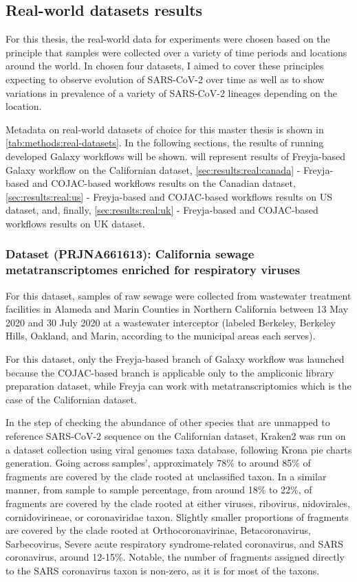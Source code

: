     
    \subsection{Real-world datasets results} \label{sec:results:real}
    For this thesis, the real-world data for experiments were chosen based on the principle that samples were collected over a variety of time periods and locations around the world. In chosen four datasets, I aimed to cover these principles expecting to observe evolution of SARS-CoV-2 over time as well as to show variations in prevalence of a variety of SARS-CoV-2 lineages depending on the location.

    Metadata on real-world datasets of choice for this master thesis is shown in \cref{tab:methods:real-datasets}. In the following sections, the results of running developed Galaxy workflows will be shown.  will represent results of Freyja-based Galaxy workflow on the Californian dataset, \cref{sec:results:real:canada} - Freyja-based and COJAC-based workflows results on the Canadian dataset, \cref{sec:results:real:us} - Freyja-based and COJAC-based workflows results on US dataset, and, finally, \cref{sec:results:real:uk} - Freyja-based and COJAC-based workflows results on UK dataset. 

    \subsubsection{Dataset (PRJNA661613): California sewage metatranscriptomes enriched for respiratory viruses} \label{sec:results:real:california}
    For this dataset, samples of raw sewage were collected from wastewater treatment facilities in Alameda and Marin Counties in Northern California between 13 May 2020 and 30 July 2020 at a wastewater interceptor (labeled Berkeley, Berkeley Hills, Oakland, and Marin, according to the municipal areas each serves).

    For this dataset, only the Freyja-based branch of Galaxy workflow was launched because the COJAC-based branch is applicable only to the ampliconic library preparation dataset, while Freyja can work with metatranscriptomics which is the case of the Californian dataset.
    
    In the step of checking the abundance of other species that are unmapped to reference SARS-CoV-2 sequence on the Californian dataset, Kraken2 was run on a dataset collection using viral genomes taxa database, following Krona pie charts generation. Going across samples’, approximately 78\% to around 85\% of fragments are covered by the clade rooted at unclassified taxon. In a similar manner, from sample to sample percentage, from around 18\% to 22\%, of fragments are covered by the clade rooted at either viruses, ribovirus, nidovirales, cornidovirineae, or coronaviridae taxon. Slightly smaller proportions of fragments are covered by the clade rooted at Orthocoronavirinae, Betacoronavirus, Sarbecovirus, Severe acute respiratory syndrome-related coronavirus, and SARS coronavirus, around 12-15\%. Notable, the number of fragments assigned directly to the SARS coronavirus taxon is non-zero, as it is for most of the taxons. 
    
